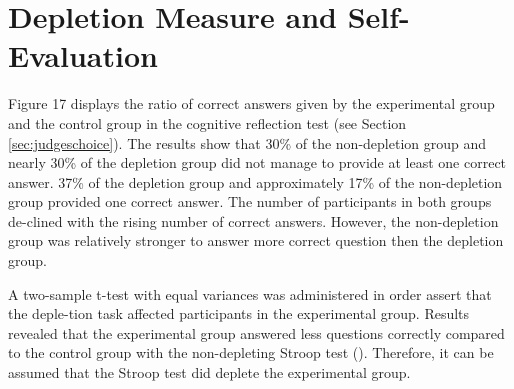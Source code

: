 \FloatBarrier
\section{Depletion Measure and Self-Evaluation}\label{sec:depletion_measure_selfevaluation}
Figure 17 displays the ratio of correct answers given by the experimental group and the control group in the cognitive reflection test (see Section \ref{sec:judgeschoice}). The results show that 30\% of the non-depletion group and nearly 30\% of the depletion group did not manage to provide at least one correct answer. 37\% of the depletion group and approximately 17\% of the non-depletion group provided one correct answer. The number of participants in both groups de-clined with the rising number of correct answers. However, the non-depletion group was relatively stronger to answer more correct question then the depletion group. \par
A two-sample t-test with equal variances was administered in order assert that the deple-tion task affected participants in the experimental group. Results revealed that the experimental group answered less questions correctly compared to the control group with the non-depleting Stroop test (). Therefore, it can be assumed that the Stroop test did deplete the experimental group. \par
